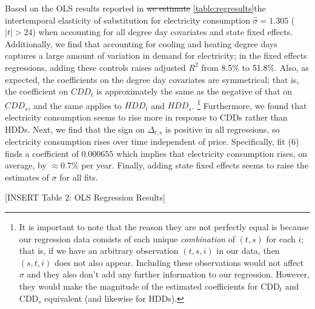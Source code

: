 \documentclass[11pt,a4paper,leqno]{extarticle}
\providecommand{\DIFadd}[1]{{\protect\color{blue}\uwave{#1}}} %
\providecommand{\DIFdel}[1]{{\protect\color{red}\sout{#1}}}                      %
\providecommand{\DIFaddbegin}{} %
\providecommand{\DIFaddend}{} %
\providecommand{\DIFdelbegin}{} %
\providecommand{\DIFdelend}{} %
\begin{document}
	
	
	
	Based on the OLS results reported in \DIFdelbegin %
	\DIFdel{we estimate }\DIFdelend \DIFaddbegin \autoref{table:regresults}\DIFadd{, we find that }\DIFaddend the intertemporal elasticity of substitution for electricity consumption \DIFaddbegin \DIFadd{is }\DIFaddend $\hat{\sigma}  = 1.305$ ($|t| > 24$) when accounting for all degree day covariates and state fixed effects. Additionally, we find that accounting for cooling and heating degree days captures a large amount of variation in demand for electricity; in the fixed effects regressions, adding these controls raises adjusted $R^2$ from 8.5\% to 51.8\%. Also, as expected, the coefficients on the degree day covariates are symmetrical; that is, the coefficient on $CDD_{t}$ is approximately the same as the negative of that on $CDD_{s}$, and the same applies to $HDD_{t}$ and $HDD_{s}$. \footnote{It is important to note that the reason they are not perfectly equal is because our regression data consists of each unique \textit{combination} of $(t,s)$ for each $i$; that is, if we have an arbitrary observation $(t,s,i)$ in our data, then $(s,t,i)$ does not also appear. Including these observations would not affect $\sigma$ and they also don't add any further information to our regression. However, they would make the magnitude of the estimated coefficients for  CDD$_t$ and CDD$_s$ equivalent (and likewise for HDDs). }  Furthermore, we found that electricity consumption seems to rise more in response to CDDs rather than HDDs.  Next, we find that the sign on $\Delta_{t,s}$ is positive in all regressions, so electricity consumption rises over time independent of price. Specifically, fit (6) finds a coefficient of $0.000655$ which implies that electricity consumption rises, on average, by $\approx 0.7\%$ per year. Finally, adding state fixed effects seems to raise the estimates of $\sigma$ for all fits. 
	
	\vspace{0.15in}
	\begin{center}
		[INSERT Table 2: OLS \DIFaddbegin \DIFadd{and 2SLS }\DIFaddend Regression Results]
	\end{center}
	\vspace{0.15in}
	
\end{document}

